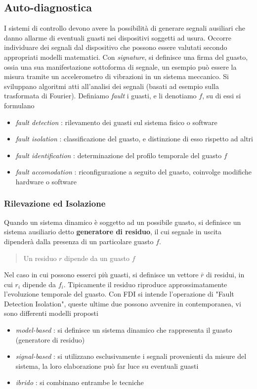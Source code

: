 \documentclass[10pt, letterpaper]{report}
\begin{document}
\subsection{Auto-diagnostica}
I sistemi di controllo devono avere la possibilità di generare segnali ausiliari che danno allarme di eventuali guasti 
nei dispositivi soggetti ad usura. Occorre individuare dei segnali dal dispositivo che possono essere 
valutati secondo appropriati modelli matematici. \acc 
Con \textit{signature}, si definisce una firma del guasto, ossia una sua manifestazione sottoforma di segnale, un esempio 
può essere la misura tramite un accelerometro di vibrazioni in un sistema meccanico. Si sviluppano algoritmi atti 
all'analisi dei segnali (basati ad esempio sulla trasformata di Fourier).\acc 
Definiamo \textit{fault} i guasti, e li denotiamo $f$, su di essi si formulano\begin{itemize}
    \item \textit{fault detection} : rilevamento dei guasti sul sistema fisico o software 
    \item \textit{fault isolation} : classificazione del guasto, e distinzione di esso rispetto ad altri 
    \item \textit{fault identification} : determinazione del profilo temporale del guasto $f$ 
    \item \textit{fault accomodation} : riconfigurazione a seguito del guasto, coinvolge modifiche hardware o software
\end{itemize}
\subsubsection{Rilevazione ed Isolazione }
Quando un sistema dinamico è soggetto ad un possibile guasto, si definisce un sistema ausiliario detto 
\textbf{generatore di residuo}, il cui segnale in uscita dipenderà dalla presenza di un particolare guasto 
$f$. \begin{quote}
    Un residuo $r$ dipende da un guasto $f$
\end{quote}
Nel caso in cui possono esserci più guasti, si definisce un vettore $\bar r$ di residui, in cui $r_i$ dipende 
da $f_i$. Tipicamente il residuo riproduce approssimatamente l'evoluzione temporale del guasto. Con FDI si intende l'operazione 
di "Fault Detection Isolation", queste ultime due possono avvenire in contemporanea, vi sono differenti modelli proposti\begin{itemize}
    \item \textit{model-based} : si definisce un sistema dinamico che rappresenta il guasto (generatore di residuo)
    \item \textit{signal-based} : si utilizzano esclusivamente i segnali provenienti da misure del sistema, la loro 
    elaborazione può far luce su eventuali guasti 
    \item \textit{ibrido} : si combinano entrambe le tecniche
\end{itemize}
\end{document}
